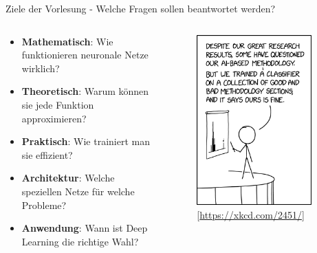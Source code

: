 \documentclass[aspectratio=1610, xcolor=dvipsnames, 9pt]{beamer}
\begin{document}
\begin{frame}{Ziele der Vorlesung - Welche Fragen sollen beantwortet werden?}
  \begin{columns}
    \begin{column}{0.69\textwidth}
      \begin{itemize}
        \item \textbf{Mathematisch}: Wie funktionieren neuronale Netze wirklich? \newline
        \item \textbf{Theoretisch}: Warum können sie jede Funktion approximieren? \newline
        \item \textbf{Praktisch}: Wie trainiert man sie effizient? \newline
        \item \textbf{Architektur}: Welche speziellen Netze für welche Probleme? \newline
        \item \textbf{Anwendung}: Wann ist Deep Learning die richtige Wahl? \newline
      \end{itemize}
    \end{column}
    \begin{column}{0.3\textwidth}
 \begin{figure}
 \centering
             \includegraphics[width=0.9\textwidth]{images/ai_methodology.png}
             [\url{https://xkcd.com/2451/}]
 \end{figure}
    \end{column}
  \end{columns}
\end{frame}
\end{document}
